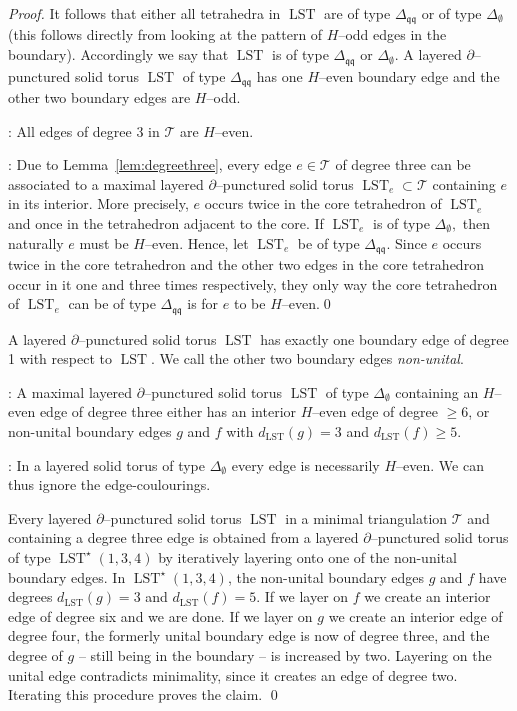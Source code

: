 \documentclass[a4paper]{gtart}
\def\lst{\operatorname{LST}}
\def\tri{\mathcal{T}}
\def\Tee{\Delta_{\emptyset}}
\def\Tqq{\Delta_{\mathfrak{qq}}}
\theoremstyle{plain}
\theoremstyle{definition}
\theoremstyle{remark}
\numberwithin{equation}{section}
\begin{document}
\begin{proof}
It follows that either all tetrahedra in $\lst$ are of type $\Tqq$ or of type $\Tee$ (this follows directly from looking at the pattern of $H$--odd edges in the boundary). Accordingly we say that $\lst$ is of type $\Tqq$ or $\Tee.$ A layered $\partial$--punctured solid torus $\lst$ of type $\Tqq$ has one $H$--even boundary edge and the other two boundary edges are $H$--odd.

: All edges of degree 3 in $\tri$ are $H$--even.

: Due to Lemma~\ref{lem:degreethree}, every edge $e \in \tri$ of degree three can be associated to a maximal layered $\partial$--punctured solid torus $\lst_e \subset \tri$ containing $e$ in its interior. More precisely, $e$ occurs twice in the core tetrahedron of $\lst_e$ and once in the tetrahedron adjacent to the core. If $\lst_e$ is of type $\Tee,$ then naturally $e$ must be $H$--even. Hence, let $\lst_e$ be of type $\Tqq.$ Since $e$ occurs twice in the core tetrahedron and the other two edges in the core tetrahedron occur in it one and three times respectively, they only way the core tetrahedron of $\lst_e$ can be of type $\Tqq$ is for $e$ to be $H$--even.\qed

A layered $\partial$--punctured solid torus $\lst$ has exactly one boundary edge of degree 1 with respect to $\lst.$ We call the other two boundary edges \emph{non-unital}. 

: A maximal layered $\partial$--punctured solid torus $\lst$ of type $\Tee$ containing an $H$--even edge of degree three either has an interior $H$--even edge of degree $\geq 6$, or non-unital boundary edges $g$ and $f$ with $d_{\lst}(g) = 3$ and $d_{\lst}(f) \geq 5$.

: In a layered solid torus of type $\Tee$ every edge is necessarily $H$--even. We can thus ignore the edge-coulourings. 

Every layered $\partial$--punctured solid torus $\lst$ in a minimal triangulation $\tri$ and containing a degree three edge is obtained from a layered $\partial$--punctured solid torus of type $\lst^{\star} (1,3,4)$ by iteratively layering onto one of the non-unital boundary edges. In $\lst^{\star} (1,3,4)$, the non-unital boundary edges $g$ and $f$ have degrees $d_{\lst}(g) = 3$ and $d_{\lst}(f) = 5$. If we layer on $f$ we create an interior edge of degree six and we are done. If we layer on $g$ we create an interior edge of degree four, the formerly unital boundary edge is now of degree three, and the degree of $g$ -- still being in the boundary -- is increased by two. Layering on the unital edge contradicts minimality, since it creates an edge of degree two. Iterating this procedure proves the claim.
\qed


\end{proof}
\end{document}
